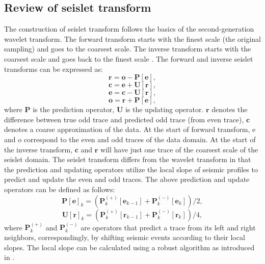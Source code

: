 \subsection{Review of seislet transform}
The construction of seislet transform \cite[]{seislet} follows the basics of the second-generation wavelet transform. The forward transform starts with the finest scale (the original sampling) and goes to the coarsest scale. The inverse transform starts with the coarsest scale and goes back to the finest scale \cite[]{yangkang20142}. The forward and inverse seislet transforms can be
expressed as:
\begin{equation}
\label{eq:one}
\mathbf{r}=\mathbf{o}-\mathbf{P\left[e\right]},
\end{equation}
\begin{equation}
\label{eq:two}
\mathbf{c}=\mathbf{e}+\mathbf{U\left[r\right]},
\end{equation}
\begin{equation}
\label{eq:three}
\mathbf{e}=\mathbf{c}-\mathbf{U\left[r\right]},
\end{equation}
\begin{equation}
\label{eq:four}
\mathbf{o}=\mathbf{r}+\mathbf{P\left[e\right]},
\end{equation}
where $\mathbf{P}$ is the prediction operator, $\mathbf{U}$ is the updating operator. $\mathbf{r}$ denotes the difference between true odd trace and predicted odd trace (from even trace), $\mathbf{c}$ denotes a coarse approximation of the data. At the start of forward transform, e and o correspond to the even and odd
traces of the data domain. At the start of the inverse transform, $\mathbf{c}$ and $\mathbf{r}$ will have just one
trace of the coarsest scale of the seislet domain. The seislet transform differs from the wavelet transform in that the prediction and updating operators utilize the local slope of seismic profiles to predict and update the even and odd traces. The above prediction and update operators can be defined as follows:
\begin{equation}
\label{eq:five}
\mathbf{P}\left[\mathbf{e}\right]_k=\left(\mathbf{P}^{(+)}_k\left[\mathbf{e}_{k-1}\right]+\mathbf{P}^{(-)}_k\left[\mathbf{e}_k\right]\right)/2,
\end{equation}
\begin{equation}
\label{eq:six}
\mathbf{U}\left[\mathbf{r}\right]_k=\left(\mathbf{P}^{(+)}_k\left[\mathbf{r}_{k-1}\right]+\mathbf{P}^{(-)}_k\left[\mathbf{r}_k\right]\right)/4,
\end{equation}
where $\mathbf{P}^{(+)}_k$ and $\mathbf{P}^{(-)}_k$ are operators that predict a trace from its left and right neighbors, correspondingly, by shifting seismic events according to their local slopes.
The local slope can be calculated using a robust algorithm as introduced in \cite{fomel2002pwd}.


